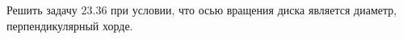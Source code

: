 Решить задачу $23.36$ при условии, что осью вращения диска является 
диаметр, перпендикулярный хорде.
 